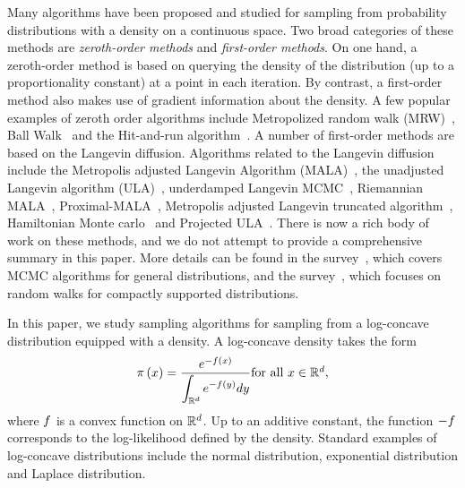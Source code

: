 \documentclass[final, 12pt]{colt2018} %
\begin{document}
Many algorithms have been proposed and studied for sampling from
probability distributions with a density on a continuous space.  Two
broad categories of these methods are \emph{zeroth-order methods} and
\emph{first-order methods}. On one hand, a zeroth-order method is
based on querying the density of the distribution (up to a
proportionality constant) at a point in each iteration.  By contrast,
a first-order method also makes use of gradient information about the
density.  A few popular examples of zeroth order algorithms include
Metropolized random walk
(MRW)~\citep{mengersen1996rates,roberts1996geometric}, Ball
Walk~\citep{lovasz1990ballwalk,dyer1991random,lovasz1993random} and the
Hit-and-run algorithm~\citep{belisle1993hit, kannan1995isoperimetric,
  lovasz1999hit,lovasz2006hit, lovasz2007geometry}.  A number of
first-order methods are based on the Langevin diffusion.  Algorithms
related to the Langevin diffusion include the Metropolis adjusted
Langevin Algorithm (MALA)~\citep{roberts1996exponential,
  roberts2002langevin,bou2012nonasymptotic}, the unadjusted Langevin
algorithm (ULA)~\citep{parisi1981correlation,
  grenander1994representations,
  roberts1996exponential,dalalyan2016theoretical}, underdamped
Langevin MCMC~\citep{cheng2017underdamped}, Riemannian
MALA~\citep{xifara2014langevin},
Proximal-MALA~\citep{pereyra2016proximal, durmus2016efficient},
Metropolis adjusted Langevin truncated
algorithm~\citep{roberts1996exponential}, Hamiltonian Monte
carlo~\citep{neal2011mcmc} and Projected ULA~\citep{bubeck2015sampling}.
There is now a rich body of work on these methods, and we do not
attempt to provide a comprehensive summary in this paper.  More
details can be found in the survey~\citep{roberts2004general}, which
covers MCMC algorithms for general distributions, and the
survey~\citep{vempala2005geometric}, which focuses on random walks for
compactly supported distributions.

In this paper, we study sampling algorithms for sampling from a
log-concave distribution equipped with a density.  A log-concave
density takes the form
\begin{align}
\label{eq:target}
  \pi\left( x \right) =
  \frac{e^{-f(x)}}{\displaystyle\int_{\mathbb{R}^{d}} e^{-f(y)}
    dy} \mbox{for all $x \in \mathbb{R}^{d}$,}
\end{align}
where $f$ is a convex function on $\mathbb{R}^{d}$.  Up to an additive
constant, the function $-f$ corresponds to the log-likelihood
defined by the density.  Standard examples of log-concave
distributions include the normal distribution, exponential
distribution and Laplace distribution.
\end{document}
